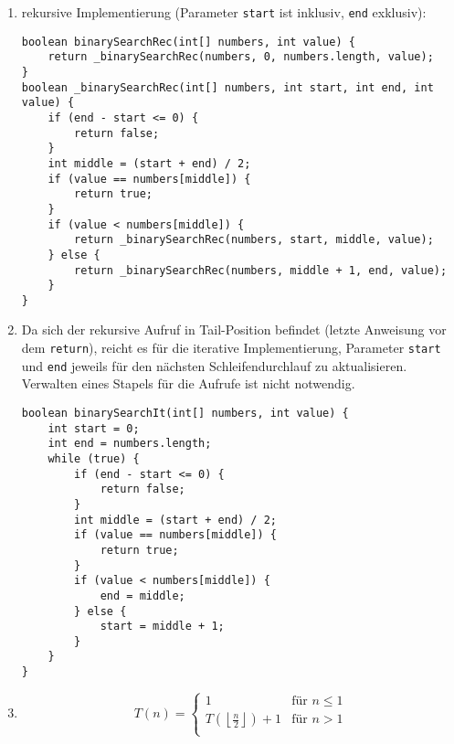 \documentclass[11pt,a4paper]{article}
\begin{document}
\begin{loesung}
\begin{enumerate}
    \item rekursive Implementierung (Parameter \texttt{start} ist inklusiv, \texttt{end} exklusiv):\\
\begin{minipage}{\linewidth}
    \begin{lstlisting}
boolean binarySearchRec(int[] numbers, int value) {
    return _binarySearchRec(numbers, 0, numbers.length, value);
}
boolean _binarySearchRec(int[] numbers, int start, int end, int value) {
    if (end - start <= 0) {
        return false;
    }
    int middle = (start + end) / 2;
    if (value == numbers[middle]) {
        return true;
    }
    if (value < numbers[middle]) {
        return _binarySearchRec(numbers, start, middle, value);
    } else {
        return _binarySearchRec(numbers, middle + 1, end, value);
    }
}
    \end{lstlisting}
\end{minipage}
    \item Da sich der rekursive Aufruf in Tail-Position befindet (letzte Anweisung vor dem \texttt{return}), reicht es für die iterative Implementierung, Parameter \texttt{start} und \texttt{end} jeweils für den nächsten Schleifendurchlauf zu aktualisieren.
    Verwalten eines Stapels für die Aufrufe ist nicht notwendig.\\
\begin{minipage}{\linewidth}
    \begin{lstlisting}
boolean binarySearchIt(int[] numbers, int value) {
    int start = 0;
    int end = numbers.length;
    while (true) {
        if (end - start <= 0) {
            return false;
        }
        int middle = (start + end) / 2;
        if (value == numbers[middle]) {
            return true;
        }
        if (value < numbers[middle]) {
            end = middle;
        } else {
            start = middle + 1;
        }
    }
}
    \end{lstlisting}
\end{minipage}
    \item 
    \begin{equation}
        T(n) = \begin{cases}
            1 & \text{für $n \leq 1$} \\
            T(\left\lfloor \frac{n}{2} \right\rfloor) + 1  & \text{für $n > 1$} \\
        \end{cases}
    \end{equation}
\end{enumerate}

\end{loesung}
\end{document}
